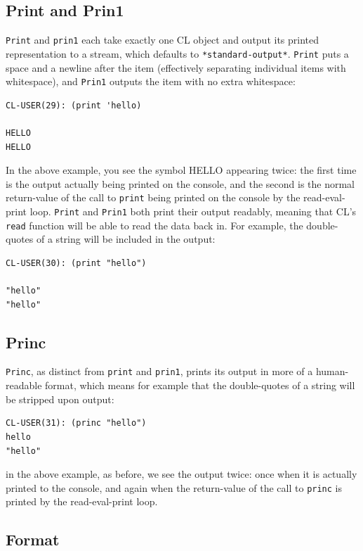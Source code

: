 \subsection{Print and Prin1}

\texttt{Print} and \texttt{prin1} each take exactly one CL object and output its printed representation to
a stream, which defaults to \texttt{*standard-output*}. \texttt{Print} puts a space and a newline after
the item (effectively separating individual items with whitespace), and \texttt{Prin1} outputs the
item with no extra whitespace:

\begin{verbatim}
CL-USER(29): (print 'hello)

HELLO
HELLO
\end{verbatim}

In the above example, you see the symbol HELLO appearing twice: the first time is the
output actually being printed on the console, and the second is the normal return-value of
the call to \texttt{print} being printed on the console by the read-eval-print loop. \texttt{Print} and \texttt{Prin1}
both print their output readably, meaning that CL's \texttt{read} function will be able to read the
data back in. For example, the double-quotes of a string will be included in the output:

\begin{verbatim}
CL-USER(30): (print "hello")

"hello"
"hello"
\end{verbatim}

\subsection{Princ}

\texttt{Princ}, as distinct from \texttt{print} and \texttt{prin1}, prints its output in more of a human-readable
format, which means for example that the double-quotes of a string will be stripped upon
output:

\begin{verbatim}
CL-USER(31): (princ "hello")
hello
"hello"
\end{verbatim}

in the above example, as before, we see the output twice: once when it is actually printed
to the console, and again when the return-value of the call to \texttt{princ} is printed by the
read-eval-print loop.

\subsection{Format}

